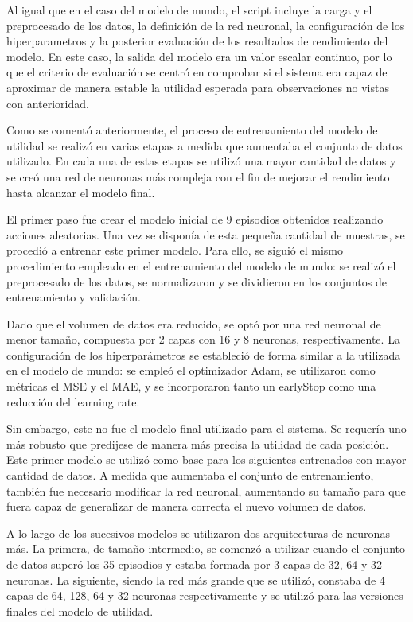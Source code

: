 Al igual que en el caso del modelo de mundo, el \gls{script} incluye la carga y el preprocesado de los datos, la definición de la red neuronal, la configuración de los hiperparametros y la 
posterior evaluación de los resultados de rendimiento del modelo. En este caso, la salida del modelo era un valor escalar continuo, por lo que el criterio de evaluación se centró en comprobar 
si el sistema era capaz de aproximar de manera estable la utilidad esperada para observaciones no vistas con anterioridad.

Como se comentó anteriormente, el proceso de entrenamiento del modelo de utilidad se realizó en varias etapas a medida que aumentaba el conjunto de datos utilizado. En cada una de estas etapas 
se utilizó una mayor cantidad de datos y se creó una red de neuronas más compleja con el fin de mejorar el rendimiento hasta alcanzar el modelo final.

El primer paso fue crear el modelo inicial de 9 episodios obtenidos realizando acciones aleatorias. Una vez se disponía de esta pequeña cantidad de muestras, se procedió a entrenar este primer 
modelo. Para ello, se siguió el mismo procedimiento empleado en el entrenamiento del modelo de mundo: se realizó el preprocesado de los datos, se normalizaron y se dividieron en los conjuntos 
de entrenamiento y validación.

Dado que el volumen de datos era reducido, se optó por una red neuronal de menor tamaño, compuesta por 2 capas con 16 y 8 neuronas, respectivamente. La configuración de los hiperparámetros se 
estableció de forma similar a la utilizada en el modelo de mundo: se empleó el optimizador Adam, se utilizaron como métricas el MSE y el MAE, y se incorporaron tanto un earlyStop como una 
reducción del learning rate.

Sin embargo, este no fue el modelo final utilizado para el sistema. Se requería uno más robusto que predijese de manera más precisa la utilidad de cada posición. Este primer modelo se utilizó 
como base para los siguientes entrenados con mayor cantidad de datos. A medida que aumentaba el conjunto de entrenamiento, también fue necesario modificar la red neuronal, aumentando su tamaño 
para que fuera capaz de generalizar de manera correcta el nuevo volumen de datos.

A lo largo de los sucesivos modelos se utilizaron dos arquitecturas de neuronas más. La primera, de tamaño intermedio, se comenzó a utilizar cuando el conjunto de datos superó los 35 episodios 
y estaba formada por 3 capas de 32, 64 y 32 neuronas. La siguiente, siendo la red más grande que se utilizó, constaba de 4 capas de 64, 128, 64 y 32 neuronas respectivamente y se utilizó para 
las versiones finales del modelo de utilidad.

